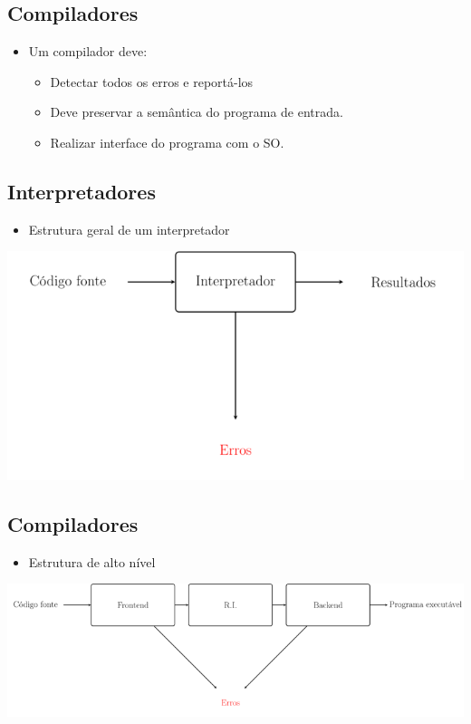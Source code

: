 \documentclass[11pt]{article}
\begin{document}
\subsection*{Compiladores}
\label{sec:org9ba53c8}

\begin{itemize}
\item Um compilador deve:
\begin{itemize}
\item Detectar todos os erros e reportá-los
\item Deve preservar a semântica do programa de entrada.
\item Realizar interface do programa com o SO.
\end{itemize}
\end{itemize}
\subsection*{Interpretadores}
\label{sec:orged7a829}

\begin{itemize}
\item Estrutura geral de um interpretador
\end{itemize}

\begin{center}
\includegraphics[width=.9\linewidth]{./imgs/image2.png}
\end{center}
\subsection*{Compiladores}
\label{sec:orgfd5ab1e}

\begin{itemize}
\item Estrutura de alto nível
\end{itemize}

\begin{center}
\includegraphics[width=.9\linewidth]{./imgs/image3.png}
\end{center}
\end{document}

